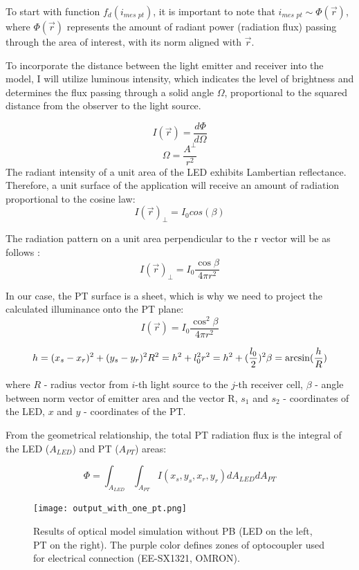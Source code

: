To start with function $f_d(i_{\textit{mes pt}})$, it is important to note that $i_{\textit{mes pt}} 
\sim \Phi(\vec{r})$, where $\Phi(\vec{r})$ represents the amount of radiant power (radiation flux) passing through the area of interest, with its norm aligned with $\vec{r}$.

To incorporate the distance between the light emitter and receiver into the model, I will utilize luminous intensity, which indicates the level of brightness and determines the flux passing through a solid angle 
$\Omega$, proportional to the squared distance from the observer to the light source.

\[I(\vec{r}) = \frac{d\Phi}{d\Omega} \]
\[\Omega = \frac{A^\perp}{r^2}\]
The radiant intensity of a unit area of the LED exhibits Lambertian reflectance. 
Therefore, a unit surface of the application will receive an amount of radiation proportional to the cosine law:
\[I(\vec{r})_\perp = I_{0} cos (\beta)\]

The radiation pattern on a unit area perpendicular to the r vector will be as follows \cite{my_love_pressure_photosensor}:
\[I(\vec{r})_\perp = I_0 \frac{\cos{\beta}}{4 \pi r^2}\]

In our case, the PT surface is a sheet, which is why we need to project the calculated illuminance onto the PT plane: 
$$I(\vec{r}) = I_0 \frac{\cos^2{\beta}}{4 \pi r^2}$$

\[
h = (x_s- x_r)^2 + (y_s - y_r)^2\\
R^2 = h^2 + l_0^2\\
r^2  = h^2 + (\frac{l_0}{2})^2\\
\beta = \arcsin(\frac{h}{R})\\
\]

where $R$ - radius vector from $i$-th light source to the $j$-th receiver cell,
$\beta$ - angle between norm vector of emitter area and the vector R,
$s_1$ and $s_2$ - coordinates of the LED,
$x$ and $y$ - coordinates of the PT.

From the geometrical relationship, the total PT radiation flux is the integral of the LED ($A_{LED}$) and PT ($A_{PT}$) areas:

$$\Phi = \int_{A_{LED}} \int_{A_{PT}} I(x_s, y_s, x_r, y_r)d A_{LED} d A_{PT}$$

\begin{figure}[H]
    \texttt{[image: output\_with\_one\_pt.png]}
      \centering
      \caption{Results of optical model simulation without PB (LED on the left, PT on the right). The purple color defines zones of optocoupler used for electrical connection (EE-SX1321, OMRON).}
      \label{fig:led_sim_res_one_pt}
\end{figure}

